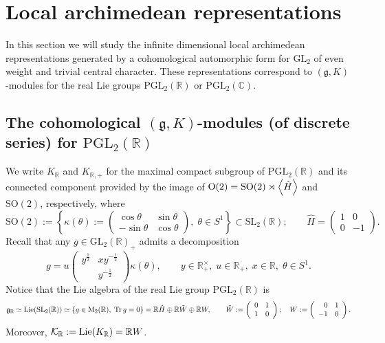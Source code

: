 \documentclass{amsart}
\theoremstyle{definition}
\theoremstyle{remark}
\numberwithin{equation}{section}
\newcommand{\M}{\mathrm{M}}
\newcommand{\PGL}{{\mathrm{PGL}}}
\newcommand{\GL}{{\mathrm{GL}}}
\newcommand{\SO}{{\mathrm {SO}}}
\newcommand{\SL}{{\mathrm {SL}}}
\newcommand{\C}{{\mathbb C}}
\newcommand{\R}{{\mathbb R}}
\newcommand{\cK}{{\mathcal K}}
\newcommand{\mfg}{{\mathfrak g}}
\begin{document}
\section{Local archimedean representations}\label{LocArchRep}

In this section we will study the infinite dimensional local archimedean representations generated by a cohomological automorphic form for $\GL_2$ of even weight and trivial central character. These representations correspond to $(\mfg,K)$-modules for the real Lie groups $\PGL_2(\R)$ or $\PGL_2(\C)$.


\subsection{The cohomological $(\mfg,K)$-modules (of discrete series) for $\PGL_2(\R)$}\label{GKR}

We write $K_\R$ and $K_{\R,+}$ for the maximal compact subgroup of $\PGL_2(\R)$ and its connected component provided by the image of ${\rm O}(2)=\SO(2)\rtimes\left\langle\hat H\right\rangle$ and $\SO(2)$, respectively, where
\[
\SO(2):=\left\{\kappa(\theta):=\left(\begin{array}{cc}\cos\theta&\sin\theta\\-\sin\theta&\cos\theta\end{array}\right),\;\theta\in S^1\right\}\subset \SL_2(\R);\qquad \hat H=\left(\begin{array}{rr}
       1  & 0 \\
        0 & -1
    \end{array}\right).
\]
Recall that any $g\in\GL_2(\R)_+$ admits a decomposition
\begin{equation}\label{eqstar}
g=u\left(\begin{array}{rr}y^{\frac{1}{2}}&xy^{-\frac{1}{2}}\\&y^{-\frac{1}{2}}\end{array}\right)\kappa(\theta),\qquad y\in\R_+^\times,\;u\in\R_+,\;x\in\R,\;\theta\in S^1.
\end{equation}
Notice that the Lie algebra of the real Lie group $\PGL_2(\R)$ is 
\[
\mfg_\R\simeq {\rm Lie}(\SL_2(\R))\simeq\{g\in\M_2(\R),\;\operatorname{Tr} g=0\}=\R \hat H\oplus\R\tilde W\oplus\R W,
\qquad
\tilde W:=\left(\begin{array}{cc}
       0  & 1 \\
        1 & 0
    \end{array}\right);\quad W:=\left(\begin{array}{rr}
       0  & 1 \\
        -1 & 0
    \end{array}\right).
\]
Moreover, $\cK_\R:={\rm Lie}(K_\R)=\R W$.
\end{document}
